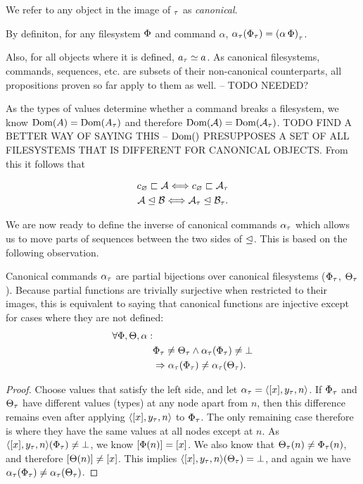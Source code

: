 We refer to any object in the image of ${}_\tau$ as \emph{canonical}.

By definiton,
for any filesystem $\Phi$ and command $\alpha$, 
${\alpha}_\tau({\Phi}_\tau) = {(\alpha\,\Phi)}_\tau$.


Also, for all objects where it is defined, ${a}_\tau\simeq a$.
As canonical filesystems, commands, sequences, etc.
are subsets of their non-canonical counterparts, 
all propositions proven so far apply to them as well.
-- TODO NEEDED? %

As the types of values determine whether a command breaks a filesystem,
we know $\textrm{Dom}({A})=\textrm{Dom}({{A}_\tau})$ and therefore $\textrm{Dom}({\mathcal{A}})=\textrm{Dom}({{\mathcal{A}}_\tau})$.
TODO FIND A BETTER WAY OF SAYING THIS -- $\textrm{Dom}({})$ PRESUPPOSES A SET OF %
ALL FILESYSTEMS THAT IS DIFFERENT FOR CANONICAL OBJECTS.
From this it follows that
\begin{mycor}
\begin{gather*}
c_\varnothing\sqsubset{\mathcal{A}} \Longleftrightarrow c_\varnothing\sqsubset{{\mathcal{A}}_\tau} \\
{\mathcal{A}}\trianglelefteq{\mathcal{B}} \Longleftrightarrow {{\mathcal{A}}_\tau}\trianglelefteq{{\mathcal{B}}_\tau}.
\end{gather*}
\end{mycor}


We are now ready to define the inverse of canonical commands ${\alpha}_\tau$
which allows us to move parts of sequences between the
two sides of $\trianglelefteq$.
This is based on the following observation.

\begin{mylem}
Canonical commands ${\alpha}_\tau$ are partial bijections over canonical filesystems
(${\Phi}_\tau$, ${\Theta}_\tau$).
Because partial functions are trivially surjective when restricted to their images, this is
equivalent to saying that canonical functions are injective except for cases
where they are not defined:
\begin{align*}
\forall\Phi,\Theta,\alpha:& \\
& {\Phi}_\tau\neq{\Theta}_\tau \wedge {\alpha}_\tau({\Phi}_\tau)\neq\bot \\
& \Rightarrow {\alpha}_\tau({\Phi}_\tau) \neq {\alpha}_\tau({\Theta}_\tau).
\end{align*}
\end{mylem}
\begin{proof}
Choose values that satisfy the left side, and let ${\alpha}_\tau = \langle{[{x}],{y}_\tau,{n}}\rangle$.
If ${\Phi}_\tau$ and ${\Theta}_\tau$ have different values (types) at any node apart from $n$, then this difference remains
even after applying $\langle{[{x}],{y}_\tau,{n}}\rangle$ to ${\Phi}_\tau$. 
The only remaining case therefore is where they have the same values
at all nodes except at $n$.
As $\langle{[{x}],{y}_\tau,{n}}\rangle({\Phi}_\tau)\neq\bot$, we know $[\Phi(n)]=[x]$.
We also know that ${\Theta}_\tau(n)\neq{\Phi}_\tau(n)$, and therefore
$[\Theta(n)]\neq[x]$.
This implies $\langle{[{x}],{y}_\tau,{n}}\rangle({\Theta}_\tau)=\bot$,
and again we have ${\alpha}_\tau({\Phi}_\tau) \neq {\alpha}_\tau({\Theta}_\tau)$.
\end{proof}

